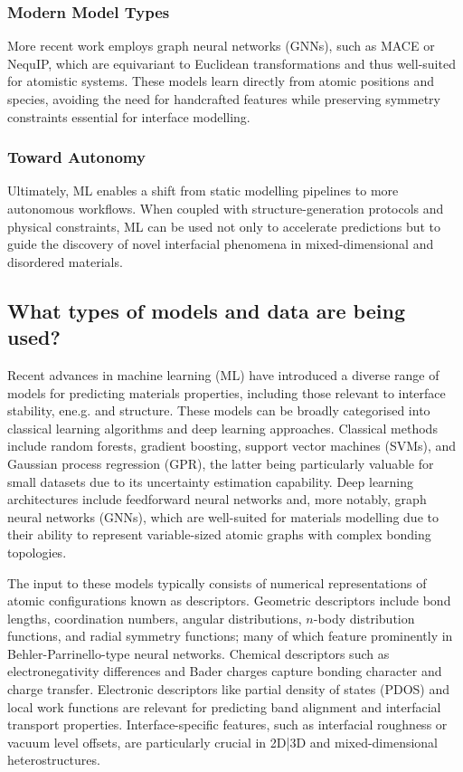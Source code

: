 \subsubsection{Modern Model Types}

More recent work employs graph neural networks (GNNs), such as MACE or NequIP, which are equivariant to Euclidean
transformations and thus well-suited for atomistic systems. These models learn directly from atomic positions and
species, avoiding the need for handcrafted features while preserving symmetry constraints essential for interface
modelling.

\subsubsection{Toward Autonomy}

Ultimately, ML enables a shift from static modelling pipelines to more autonomous workflows. When coupled with
structure-generation protocols and physical constraints, ML can be used not only to accelerate predictions but to guide
the discovery of novel interfacial phenomena in mixed-dimensional and disordered materials.

\subsection{What types of models and data are being used?}

Recent advances in machine learning (ML) have introduced a diverse range of models for predicting materials properties,
including those relevant to interface stability, ene.g. and structure. These models can be broadly categorised into
classical learning algorithms and deep learning approaches. Classical methods include random forests, gradient boosting,
support vector machines (SVMs), and Gaussian process regression (GPR), the latter being particularly valuable for small
datasets due to its uncertainty estimation capability. Deep learning architectures include feedforward neural networks
and, more notably, graph neural networks (GNNs), which are well-suited for materials modelling due to their ability to
represent variable-sized atomic graphs with complex bonding topologies.

The input to these models typically consists of numerical representations of atomic configurations known as
descriptors. Geometric descriptors include bond lengths, coordination numbers, angular distributions, $n$-body
distribution functions, and radial symmetry functions; many of which feature prominently in Behler-Parrinello-type
neural networks. Chemical descriptors such as electronegativity differences and Bader charges capture bonding character
and charge transfer. Electronic descriptors like partial density of states (PDOS) and local work functions are relevant
for predicting band alignment and interfacial transport properties. Interface-specific features, such as interfacial
roughness or vacuum level offsets, are particularly crucial in 2D|3D and mixed-dimensional heterostructures.

